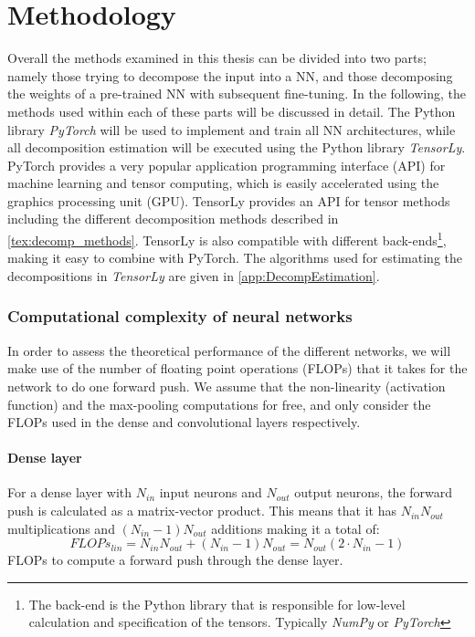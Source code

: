 \section{Methodology} \label{tex:methodology}
Overall the methods examined in this thesis can be divided into two parts; namely those trying to decompose the input into a NN, and those decomposing the weights of a pre-trained NN with subsequent fine-tuning. In the following, the methods used within each of these parts will be discussed in detail. The Python library \textit{PyTorch}\cite{pytorch} will be used to implement and train all NN architectures, while all decomposition estimation will be executed using the Python library \textit{TensorLy}\cite{tensorly}. PyTorch provides a very popular application programming interface (API) for machine learning and tensor computing, which is easily accelerated using the graphics processing unit (GPU). TensorLy provides an API for tensor methods including the different decomposition methods described in \autoref{tex:decomp_methods}. TensorLy is also compatible with different back-ends\footnote{The back-end is the Python library that is responsible for low-level calculation and specification of the tensors. Typically \textit{NumPy}\cite{numpy} or \textit{PyTorch}\cite{pytorch}}, making it easy to combine with PyTorch. The algorithms used for estimating the decompositions in \textit{TensorLy} are given in \autoref{app:DecompEstimation}.

\subsubsection{Computational complexity of neural networks}
In order to assess the theoretical performance of the different networks, we will make use of the number of floating point operations (FLOPs) that it takes for the network to do one forward push. We assume that the non-linearity (activation function) and the max-pooling computations for free, and only consider the FLOPs used in the dense and convolutional layers respectively. 

\paragraph{Dense layer}
For a dense layer with $N_{in}$ input neurons and $N_{out}$ output neurons, the forward push is calculated as a matrix-vector product. This means that it has $N_{in}N_{out}$ multiplications and $(N_{in}-1)N_{out}$ additions making it a total of:
\begin{equation}
    FLOPs_{lin} = N_{in}N_{out} + (N_{in}-1)N_{out} = N_{out} (2\cdot N_{in}-1)
\end{equation}
FLOPs to compute a forward push through the dense layer.

